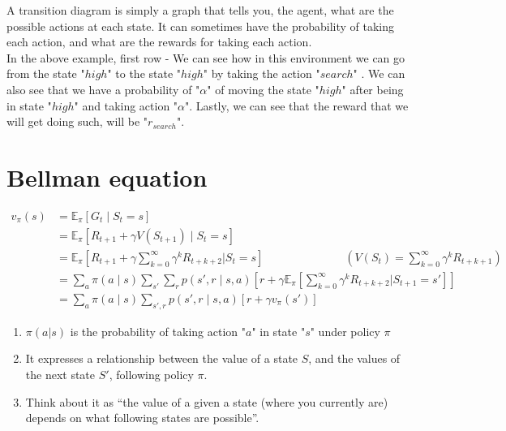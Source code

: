 A transition diagram is simply a graph that tells you, the agent, what are the possible actions at each state. It can sometimes have the probability of taking each action, and what are the rewards for taking each action.\\
In the above example, first row - We can see how in this environment we can go from the state "$high$" to the state "$high$" by taking the action "$search$" . We can also see that we have a probability of "$\alpha$" of moving the state "$high$" after being in state "$high$" and taking action "$\alpha$". Lastly, we can see that the reward that we will get doing such, will be "$r_{search}$".


\section{Bellman equation \cite{medium-introduction-to-reinforcement-learning-rl-part-3-finite-markov-decision-processes-51e1f8d3ddb7}}
\begin{align*}
v_\pi(s)  &= \mathbb{E}_\pi [G_t \mid S_t = s] \\ 
    &= \mathbb{E}_\pi [R_{t+1} + \gamma V(S_{t+1}) \mid S_t = s] \\ 
    &= \mathbb{E}_\pi \left[ R_{t+1} + \gamma \sum_{k=0}^{\infty} \gamma^k R_{t+k+2} \bigg| S_t = s \right] \hspace{3cm} \left(V(S_{t}) = \sum_{k=0}^{\infty} \gamma^k R_{t+k+1} \right) \\ 
    &= \sum_a \pi(a \mid s) \sum_{s'} \sum_r p(s', r \mid s, a) \left[ r + \gamma \mathbb{E}_\pi \left[ \sum_{k=0}^{\infty} \gamma^k R_{t+k+2} \bigg| S_{t+1} = s' \right] \right] \\ 
    &= \sum_a \pi(a \mid s) \sum_{s', r} p(s', r \mid s, a) \left[ r + \gamma v_\pi(s') \right] 
\end{align*}

\begin{enumerate}
    \item $\pi(a|s)$ is the probability of taking action "$a$" in state "$s$" under policy $\pi$
    \item It expresses a relationship between the value of a state $S$, and the values of the next state $S'$, following policy $\pi$.
    \item Think about it as “the value of a given a state (where you currently are) depends on what following states are possible”.
\end{enumerate}


